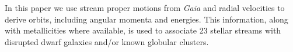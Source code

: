 \documentclass[twocolumn]{aastex63}
\newcommand{\gaia}{\textsl{Gaia}}
\begin{document}
In this paper we use stream proper motions from {\it Gaia} and radial velocities to derive orbits, including angular momenta and energies.  
This information, along with metallicities where available, is used to associate 23 stellar streams with disrupted dwarf galaxies and/or known globular clusters.

\end{document}
